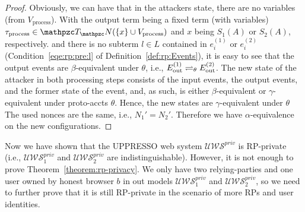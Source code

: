 \begin{proof}
    Obviously, we can have that in the attackers state, 
    there are no variables (from $V_\text{process}$). 
    With the output term being a fixed term (with variables)
    $\tau_{\text{process}} \in \terms(\{x\} \cup V_\text{process})$ 
    and $x$ being $S_1(A)$ or $S_2(A)$, respectively.
    and there is no subterm $l\in L$ contained in  
    $e_i^{(1)}$ or $e_i^{(2)}$ (Condition~\ref{eqe:rp:pre:l} of 
    Definition~\ref{def:rp:Events}), 
    it is easy to see that the output events are 
    $\beta$-equivalent under $\theta$, i.e., 
    $E ^{(1)}_\text{out} \rightleftharpoons_{\theta} E^{(2)}_\text{out}$. 
    The new state of the attacker in both processing steps 
    consists of the input events, the output events, and the 
    former state of the event, and, as such, is 
    either $\beta$-equivalent or $\gamma$-equivalent 
    under proto-accts $\theta$. 
    Hence, the new states are $\gamma$-equivalent under $\theta$
    The used nonces are the same, i.e., $N_1' = N_2'$. 
    Therefore we have $\alpha$-equivalence on the new configurations.
  \end{proof}


  \newc
  Now we have shown that the UPPRESSO web system $\mathcal{U\!W\!S}^{priv}$ is RP-private (i.e., $\mathcal{U\!W\!S}^{priv}_1$ and $\mathcal{U\!W\!S}^{priv}_2$ are indistinguishable).  
  However, it is not enough to prove Theorem~\ref{theorem:rp-privacy}.
  We only have two relying-parties and one user owned by honest browser $b$ in out models $\mathcal{U\!W\!S}^{priv}_1$ and $\mathcal{U\!W\!S}^{priv}_2$, 
  so we need to further prove that it is still RP-private in the scenario of more RPs and user identities.
  

